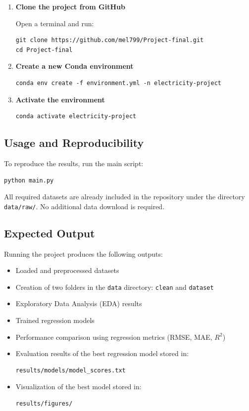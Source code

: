 \documentclass[11pt,a4paper]{article}
\begin{document}
\begin{enumerate}
    \item \textbf{Clone the project from GitHub}
    
    Open a terminal and run:
    \begin{verbatim}
git clone https://github.com/mel799/Project-final.git
cd Project-final
    \end{verbatim}
    
    \item \textbf{Create a new Conda environment}
    \begin{verbatim}
conda env create -f environment.yml -n electricity-project
    \end{verbatim}
    
    \item \textbf{Activate the environment}
    \begin{verbatim}
conda activate electricity-project
    \end{verbatim}
\end{enumerate}

\subsection{Usage and Reproducibility}

To reproduce the results, run the main script:

\begin{verbatim}
python main.py
\end{verbatim}

\noindent
All required datasets are already included in the repository under the directory \texttt{data/raw/}. No additional data download is required.

\subsection{Expected Output}

Running the project produces the following outputs:

\begin{itemize}
    \item Loaded and preprocessed datasets
    \item Creation of two folders in the \texttt{data} directory: \texttt{clean} and \texttt{dataset}
    \item Exploratory Data Analysis (EDA) results
    \item Trained regression models
    \item Performance comparison using regression metrics (RMSE, MAE, $R^2$)
    \item Evaluation results of the best regression model stored in:
    \begin{verbatim}
results/models/model_scores.txt
    \end{verbatim}
    \item Visualization of the best model stored in:
    \begin{verbatim}
results/figures/
    \end{verbatim}
\end{itemize}
\end{document}
